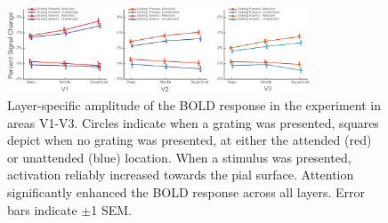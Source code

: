 \begin{figure}[!ht]
\centering
\includegraphics[width=0.8\textwidth, clip=true]{./Chapters/04_Attention/Images/LayerResults}
\caption{Layer-specific amplitude of the BOLD response in the experiment in areas V1-V3. Circles indicate when a grating was presented, squares depict when no grating was presented, at either the attended (red) or unattended (blue) location. When a stimulus was presented, activation reliably increased towards the pial surface. Attention significantly enhanced the BOLD response across all layers. Error bars indicate $\pm$1 SEM.}
\label{fig:layerresults}
\end{figure}